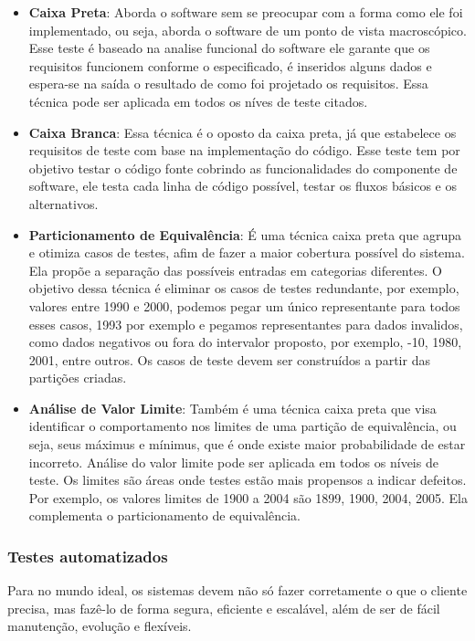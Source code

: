 \begin{itemize}
  \item \textbf{Caixa Preta}: Aborda o software sem se preocupar com a forma como ele foi implementado, ou seja, aborda o software de um ponto de vista macroscópico. Esse teste é baseado na analise funcional do software ele garante que os requisitos funcionem conforme o especificado, é inseridos alguns dados e espera-se na saída o resultado de como foi projetado os requisitos. Essa técnica pode ser aplicada em todos os níves de teste citados.
  \item \textbf{Caixa Branca}: Essa técnica é o oposto da caixa preta, já que estabelece os requisitos de teste com base na implementação do código. Esse teste tem por objetivo testar o código fonte cobrindo as funcionalidades do componente de software, ele testa cada linha de código possível, testar os fluxos básicos e os alternativos.
  \item \textbf{Particionamento de Equivalência}: É uma técnica caixa preta que agrupa e otimiza casos de testes, afim de fazer a maior cobertura possível do sistema. Ela propõe a separação das possíveis entradas em categorias diferentes. O objetivo dessa técnica é eliminar os casos de testes redundante, por exemplo, valores entre 1990 e 2000, podemos pegar um único representante para todos esses casos, 1993 por exemplo e pegamos representantes para dados invalidos, como dados negativos ou fora do intervalor proposto, por exemplo, -10, 1980, 2001, entre outros. Os casos de teste devem ser construídos a partir das partições criadas.
  \item \textbf{Análise de Valor Limite}: Também é uma técnica caixa preta que visa identificar o comportamento nos limites de uma partição de equivalência, ou seja, seus máximus e mínimus, que é onde existe maior probabilidade de estar incorreto. Análise do valor limite pode ser aplicada em todos os níveis de teste. Os limites são áreas onde testes estão mais propensos a indicar defeitos. Por exemplo, os valores limites de 1900 a 2004 são 1899, 1900, 2004, 2005. Ela complementa o particionamento de equivalência.
\end{itemize}

\subsubsection{Testes automatizados}

Para \cite{kon} no mundo ideal, os sistemas devem não só fazer corretamente o que o cliente precisa, mas fazê-lo de forma segura, eficiente e escalável, além de ser de fácil manutenção, evolução e flexíveis.

